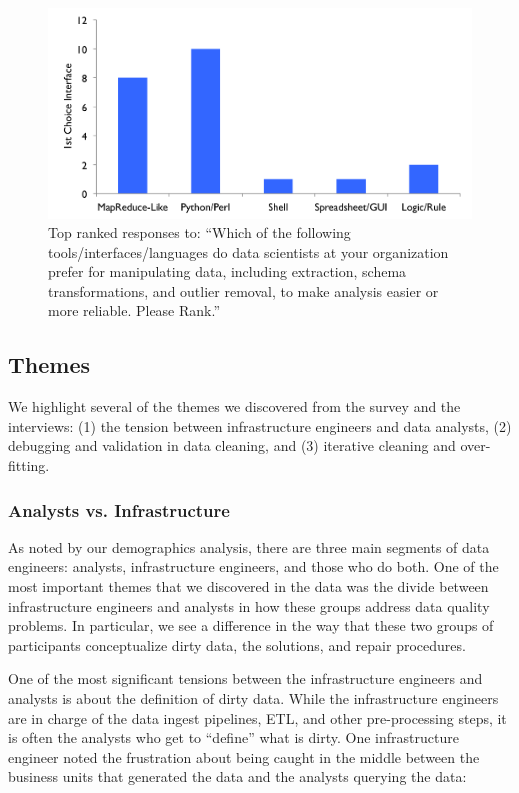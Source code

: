 \begin{figure}[t]
\centering
 \includegraphics[width=\columnwidth]{datafigs/hilda-interface.png}
 \caption{Top ranked responses to: ``Which of the following tools/interfaces/languages do data scientists at your organization prefer for manipulating data, including extraction, schema transformations, and outlier removal, to make analysis easier or more reliable. Please Rank.''\label{fig:interfaces}}
\end{figure}


\subsection{Themes}\label{sec:themes}
We highlight several of the themes we discovered from the survey and the interviews: (1) the tension between infrastructure engineers and data analysts, (2) debugging and validation in data cleaning, and (3) iterative cleaning and over-fitting.

\subsubsection{Analysts vs. Infrastructure}
As noted by our demographics analysis, there are three main segments of data engineers: analysts, infrastructure engineers, and those who do both.
One of the most important themes that we discovered in the data was the divide between infrastructure engineers and analysts in how these groups address data quality problems. In particular, we see a difference in the way that these two groups of participants conceptualize dirty data, the solutions, and repair procedures.

One of the most significant tensions between the infrastructure engineers and analysts is about the definition of dirty data. While the infrastructure engineers are in charge of the data ingest pipelines, ETL, and other pre-processing steps, it is often the analysts who get to ``define'' what is dirty. One infrastructure engineer noted the frustration about being caught in the middle between the business units that generated the data and the analysts querying the data:

